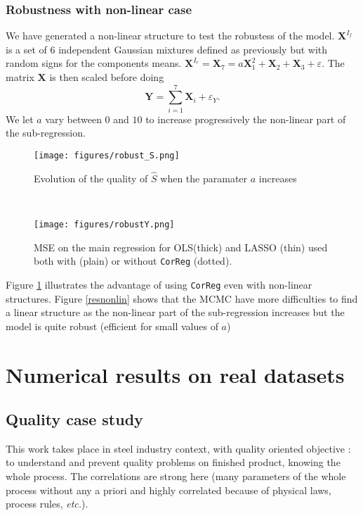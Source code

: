 \documentclass[12pt,a4paper]{report}
\begin{document}
\subsection{Robustness with non-linear case}

We have generated a non-linear structure to test the robustess of the model. $\boldsymbol{X}^{I_f}$ is a set of 6 independent Gaussian mixtures defined as previously but with random signs for the components means. $\boldsymbol{X}^{I_r}=\boldsymbol{X}_7=a\boldsymbol{X}_1^2+\boldsymbol{X}_2+\boldsymbol{X}_3+ \varepsilon$. The matrix $\boldsymbol{X}$ is then scaled before doing $$\boldsymbol{Y}=\sum_{i=1}^7\boldsymbol{X}_i+\varepsilon_Y.$$ We let $a$ vary between $0$ and $10$ to increase progressively the non-linear part of the sub-regression.

 \begin{figure}[h!] 
	\begin{minipage}[l]{.48\linewidth}
			\texttt{[image: figures/robust\_S.png]} 
			\caption{Evolution of the quality of $\hat{S}$ when the paramater $a$ increases}\label{resnonlin}
	\end{minipage} \
   \begin{minipage}[r]{.48\linewidth}
			\texttt{[image: figures/robustY.png]} 
			\caption{MSE on the main regression for OLS(thick) and LASSO (thin) used both with (plain) or without {\tt CorReg} (dotted).}\label{MSEnonlin}
   \end{minipage}
\end{figure}
Figure \ref{MSEnonlin} illustrates the advantage of using {\tt CorReg} even with non-linear structures. Figure \ref{resnonlin} shows that the MCMC have more difficulties to find a linear structure as the non-linear part of the sub-regression increases but the model is quite robust (efficient for small values of $a$)

	\FloatBarrier	
\chapter{Numerical results on real datasets} \label{sectionrealcase}
	\section{Quality case study} \label{sectionexfos}
This work takes place in steel industry context, with quality oriented objective : to understand and prevent quality problems on finished product, knowing the whole process. The correlations are strong here (many parameters of the whole process without any a priori and highly correlated because of physical laws, process rules, {\it etc.}). 
		
\end{document}
